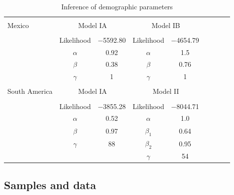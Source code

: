 \renewcommand{\arraystretch}{1.1}
\begin{table}[tb]

\begin{center}
 \caption[]{Inference of demographic parameters\hspace*{0.3cm}}
  \textbf{}\\[-2mm]
{\fontsize{7}{11}\sf
    \begin{tabular}{lcccccccl} \hline
       & & \\[-3mm]
     Mexico  & \multicolumn{2}{c}{Model IA}  &\multicolumn{2}{c}{Model IB}\\[0.1cm]
    \hline
    & & \\[-3mm]
   & Likelihood   & $-$5592.80 & Likelihood       &  $-$4654.79 \\
   &$\alpha$      & 0.92             & $\alpha$        & 1.5 \\
   &$\beta$        & 0.38             & $\beta$          & 0.76\\ 
   &$\gamma$   & 1                   &  $\gamma$   & 1\\ 
      \hline
    & & \\[-3mm]
    South America  & \multicolumn{2}{c}{Model IA}  &\multicolumn{2}{c}{Model II}\\[0.1cm]
        \hline
     & & \\[-3mm]
      & Likelihood   &  $-$3855.28 & Likelihood     &  $-$8044.71 \\
      &$\alpha$      & 0.52              & $\alpha$       & 1.0 \\
      &$\beta$        & 0.97             & $\beta_1$      & 0.64\\ 
      &$\gamma$   & 88                &  $\beta_2$     & 0.95\\ 
      &                    &                     &  $\gamma$    & 54\\ [1mm]
    \hline
    \end{tabular}
    \label{param}  %
}
\end{center}
\end{table}
\renewcommand{\arraystretch}{1}


\subsection*{Samples and data}

